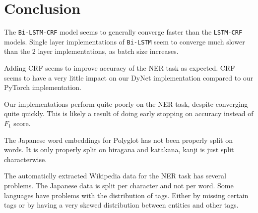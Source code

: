 

\section{Conclusion}

The \texttt{Bi-LSTM-CRF} model seems to generally converge faster than the
\texttt{LSTM-CRF} models. Single layer implementations of \texttt{Bi-LSTM}
seem to converge much slower than the 2 layer implementations, as batch size
increases.

Adding CRF seems to improve accuracy of the NER task as expected. CRF seems to
have a very little impact on our DyNet implementation compared to our PyTorch
implementation.

Our implementations perform quite poorly on the NER task, despite converging
quite quickly. This is likely a result of doing early stopping on accuracy
instead of $F_1$ score.

The Japanese word embeddings for Polyglot has not been properly split on words.
It is only properly split on hiragana and katakana, kanji is just split
characterwise.

The automaticlly extracted Wikipedia data for the NER task has several
problems.
The Japanese data is split per character and not per word.
Some languages have problems with the distribution of tags.
Either by missing certain tags or by having a very skewed distribution between
entities and other tags.




